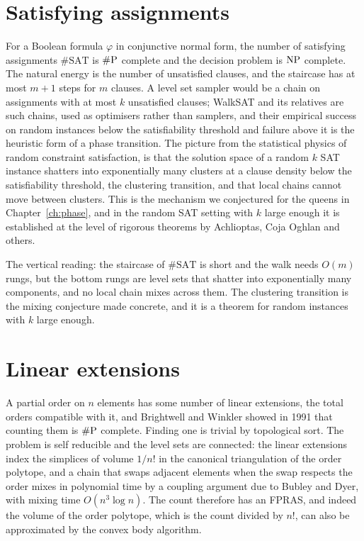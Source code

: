 \section{Satisfying assignments}

For a Boolean formula $\varphi$ in conjunctive normal form, the number of satisfying assignments $\#\mathrm{SAT}$ is $\#\mathrm{P}$ complete and the decision problem is $\mathrm{NP}$ complete. The natural energy is the number of unsatisfied clauses, and the staircase has at most $m + 1$ steps for $m$ clauses. A level set sampler would be a chain on assignments with at most $k$ unsatisfied clauses; WalkSAT and its relatives are such chains, used as optimisers rather than samplers, and their empirical success on random instances below the satisfiability threshold and failure above it is the heuristic form of a phase transition. The picture from the statistical physics of random constraint satisfaction, is that the solution space of a random $k$ SAT instance shatters into exponentially many clusters at a clause density below the satisfiability threshold, the clustering transition, and that local chains cannot move between clusters. This is the mechanism we conjectured for the queens in Chapter~\ref{ch:phase}, and in the random SAT setting with $k$ large enough it is established at the level of rigorous theorems by Achlioptas, Coja Oghlan and others.

The vertical reading: the staircase of $\#\mathrm{SAT}$ is short and the walk needs $O(m)$ rungs, but the bottom rungs are level sets that shatter into exponentially many components, and no local chain mixes across them. The clustering transition is the mixing conjecture made concrete, and it is a theorem for random instances with $k$ large enough.

\section{Linear extensions}

A partial order on $n$ elements has some number of linear extensions, the total orders compatible with it, and Brightwell and Winkler showed in 1991 that counting them is $\#\mathrm{P}$ complete. Finding one is trivial by topological sort. The problem is self reducible and the level sets are connected: the linear extensions index the simplices of volume $1/n!$ in the canonical triangulation of the order polytope, and a chain that swaps adjacent elements when the swap respects the order mixes in polynomial time by a coupling argument due to Bubley and Dyer, with mixing time $O(n^3 \log n)$. The count therefore has an FPRAS, and indeed the volume of the order polytope, which is the count divided by $n!$, can also be approximated by the convex body algorithm.

